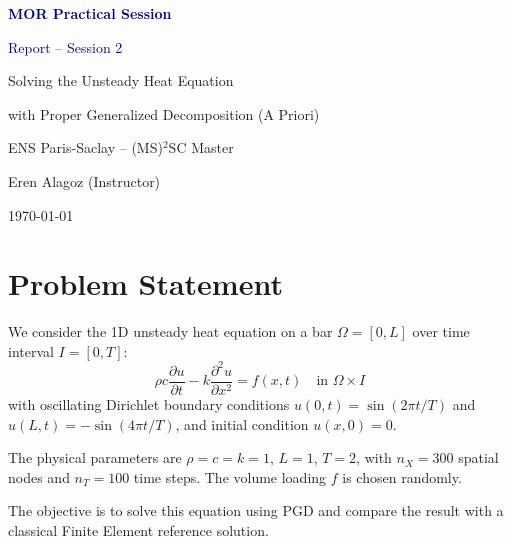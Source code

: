 \documentclass[11pt,a4paper]{article}
\begin{document}
\begin{titlepage}
\centering
\vspace*{2cm}
{\Huge\bfseries\textcolor{darkblue}{MOR Practical Session}\par}
\vspace{0.5cm}
{\LARGE\textcolor{darkblue}{Report -- Session 2}\par}
\vspace{1.5cm}
{\Large Solving the Unsteady Heat Equation\par}
{\large with Proper Generalized Decomposition (A Priori)\par}
\vspace{2cm}
{\large ENS Paris-Saclay -- (MS)$^2$SC Master\par}
\vspace{0.5cm}
{\large Eren Alagoz (Instructor)\par}
\vspace{2cm}
\vspace{1cm}
{\large \today\par}
\end{titlepage}

\tableofcontents
\newpage

\section{Problem Statement}

We consider the 1D unsteady heat equation on a bar $\Omega = [0, L]$ over time interval $I = [0, T]$:
\begin{equation}
    \rho c \frac{\partial u}{\partial t} - k \frac{\partial^2 u}{\partial x^2} = f(x,t) \quad \text{in } \Omega \times I
    \label{eq:heat}
\end{equation}
with oscillating Dirichlet boundary conditions $u(0,t) = \sin(2\pi t / T)$ and $u(L,t) = -\sin(4\pi t / T)$, and initial condition $u(x,0) = 0$.

The physical parameters are $\rho = c = k = 1$, $L = 1$, $T = 2$, with $n_X = 300$ spatial nodes and $n_T = 100$ time steps. The volume loading $f$ is chosen randomly.

The objective is to solve this equation using PGD and compare the result with a classical Finite Element reference solution.
\end{document}
